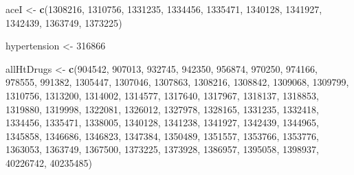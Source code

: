\documentclass[11pt]{book}
\newenvironment{Shaded}{\begin{snugshade}}{\end{snugshade}}
\newcommand{\DecValTok}[1]{\textcolor[rgb]{0.00,0.00,0.81}{#1}}
\newcommand{\KeywordTok}[1]{\textcolor[rgb]{0.13,0.29,0.53}{\textbf{#1}}}
\newcommand{\NormalTok}[1]{#1}
\newcommand{\StringTok}[1]{\textcolor[rgb]{0.31,0.60,0.02}{#1}}
\theoremstyle{definition}
\theoremstyle{definition}
\theoremstyle{definition}
\theoremstyle{remark}
\begin{document}
\begin{Shaded}
\begin{Highlighting}[]
\NormalTok{aceI <-}\StringTok{ }\KeywordTok{c}\NormalTok{(}\DecValTok{1308216}\NormalTok{, }\DecValTok{1310756}\NormalTok{, }\DecValTok{1331235}\NormalTok{, }\DecValTok{1334456}\NormalTok{, }\DecValTok{1335471}\NormalTok{, }\DecValTok{1340128}\NormalTok{, }\DecValTok{1341927}\NormalTok{,}
          \DecValTok{1342439}\NormalTok{, }\DecValTok{1363749}\NormalTok{, }\DecValTok{1373225}\NormalTok{)}

\NormalTok{hypertension <-}\StringTok{ }\DecValTok{316866}

\NormalTok{allHtDrugs <-}\StringTok{ }\KeywordTok{c}\NormalTok{(}\DecValTok{904542}\NormalTok{, }\DecValTok{907013}\NormalTok{, }\DecValTok{932745}\NormalTok{, }\DecValTok{942350}\NormalTok{, }\DecValTok{956874}\NormalTok{, }\DecValTok{970250}\NormalTok{, }\DecValTok{974166}\NormalTok{,}
                  \DecValTok{978555}\NormalTok{, }\DecValTok{991382}\NormalTok{, }\DecValTok{1305447}\NormalTok{, }\DecValTok{1307046}\NormalTok{, }\DecValTok{1307863}\NormalTok{, }\DecValTok{1308216}\NormalTok{,}
                  \DecValTok{1308842}\NormalTok{, }\DecValTok{1309068}\NormalTok{, }\DecValTok{1309799}\NormalTok{, }\DecValTok{1310756}\NormalTok{, }\DecValTok{1313200}\NormalTok{, }\DecValTok{1314002}\NormalTok{,}
                  \DecValTok{1314577}\NormalTok{, }\DecValTok{1317640}\NormalTok{, }\DecValTok{1317967}\NormalTok{, }\DecValTok{1318137}\NormalTok{, }\DecValTok{1318853}\NormalTok{, }\DecValTok{1319880}\NormalTok{,}
                  \DecValTok{1319998}\NormalTok{, }\DecValTok{1322081}\NormalTok{, }\DecValTok{1326012}\NormalTok{, }\DecValTok{1327978}\NormalTok{, }\DecValTok{1328165}\NormalTok{, }\DecValTok{1331235}\NormalTok{,}
                  \DecValTok{1332418}\NormalTok{, }\DecValTok{1334456}\NormalTok{, }\DecValTok{1335471}\NormalTok{, }\DecValTok{1338005}\NormalTok{, }\DecValTok{1340128}\NormalTok{, }\DecValTok{1341238}\NormalTok{,}
                  \DecValTok{1341927}\NormalTok{, }\DecValTok{1342439}\NormalTok{, }\DecValTok{1344965}\NormalTok{, }\DecValTok{1345858}\NormalTok{, }\DecValTok{1346686}\NormalTok{, }\DecValTok{1346823}\NormalTok{,}
                  \DecValTok{1347384}\NormalTok{, }\DecValTok{1350489}\NormalTok{, }\DecValTok{1351557}\NormalTok{, }\DecValTok{1353766}\NormalTok{, }\DecValTok{1353776}\NormalTok{, }\DecValTok{1363053}\NormalTok{,}
                  \DecValTok{1363749}\NormalTok{, }\DecValTok{1367500}\NormalTok{, }\DecValTok{1373225}\NormalTok{, }\DecValTok{1373928}\NormalTok{, }\DecValTok{1386957}\NormalTok{, }\DecValTok{1395058}\NormalTok{,}
                  \DecValTok{1398937}\NormalTok{, }\DecValTok{40226742}\NormalTok{, }\DecValTok{40235485}\NormalTok{)}
\end{Highlighting}
\end{Shaded}
\end{document}
